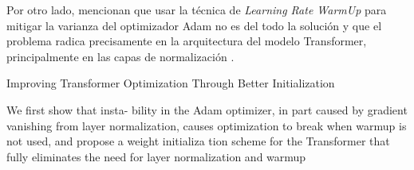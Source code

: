 Por otro lado, \citeauthor{pmlr-v119-huang20f} mencionan que usar la técnica de \textit{Learning Rate WarmUp}
para mitigar la varianza del optimizador Adam no es del todo la solución y que el problema radica
precisamente en la arquitectura del modelo Transformer, principalmente en las capas de normalización
\cite{DBLP:journals/corr/abs-1711-02132} \cite{DBLP:journals/corr/abs-2002-04745}.




Improving Transformer Optimization Through Better Initialization

We first show that insta-
bility in the Adam optimizer, in part caused by gradient
vanishing from layer normalization, causes optimization to
break when warmup is not used, and propose a weight initializa
tion scheme for the Transformer that fully eliminates the
need for layer normalization and warmup

